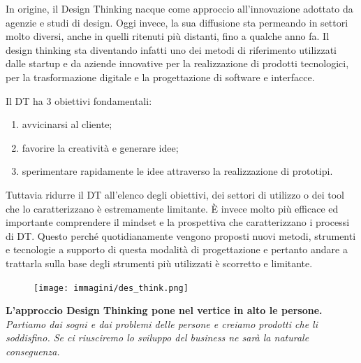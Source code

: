 In origine, il Design Thinking nacque come approccio all’innovazione adottato da agenzie e studi di design. Oggi invece, la sua diffusione sta
permeando in settori molto diversi, anche in quelli ritenuti più distanti, fino a qualche anno fa. Il design thinking sta diventando infatti uno dei
metodi di riferimento utilizzati dalle startup e da aziende innovative per la realizzazione di prodotti tecnologici, per la trasformazione digitale e
la progettazione di software e interfacce.

Il DT ha 3 obiettivi fondamentali:

\begin{enumerate}
	\itemsep-0.3em
	\item avvicinarsi al cliente;
	\item favorire la creatività e generare idee;
	\item sperimentare rapidamente le idee attraverso la realizzazione di prototipi.
\end{enumerate}

Tuttavia ridurre il DT all’elenco degli obiettivi, dei settori di utilizzo o dei tool che lo caratterizzano è estremamente limitante.
\`E invece molto più efficace ed importante comprendere il mindset e la prospettiva che caratterizzano i processi di DT. Questo perché
quotidianamente vengono proposti nuovi metodi, strumenti e tecnologie a supporto di questa modalità di progettazione e pertanto andare a trattarla
sulla base degli strumenti più utilizzati è scorretto e limitante.

\begin{figure}[!h]
	\centering
	\texttt{[image: immagini/des\_think.png]}
\end{figure}


\textbf{L’approccio Design Thinking pone nel vertice in alto le persone.}
\textit{Partiamo dai sogni e dai problemi delle persone e creiamo prodotti che li soddisfino. Se ci riusciremo lo sviluppo del business ne sarà la
naturale conseguenza.}

